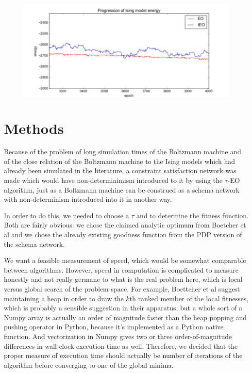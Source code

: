 \documentclass[12pt]{article}
\begin{document}
  \begin{figure}
    \includegraphics{ising_energy_zoomed}
  \end{figure}
  
  \section{Methods}


Because of the problem of long simulation times of the Boltzmann machine and of the close relation of the Boltzmann machine to the Ising models which had already been simulated in the literature, a constraint satisfaction network was made which would have non-determinimism introduced to it by using the $\tau$-EO algorithm, just as a Boltzmann machine can be construed as a schema network with non-determinism introduced into it in another way.

In order to do this, we needed to choose a $\tau$ and to determine the fitness function. Both are fairly obvious: we chose the claimed analytic optimum from Boetcher et al and we chose the already existing goodness function from the PDP version of the schema network.


We want a feasible measurement of speed, which would be somewhat comparable between algorithms. However, speed in computation is complicated to measure honestly and not really germane to what is the real problem here, which is local versus global search of the problem space. For example, Boettcher et al suggest maintaining a heap in order to draw the $k$th ranked member of the local fitnesses, which is probably a sensible suggestion in their apparatus, but a whole sort of a Numpy array is actually an order of magnitude faster than the heap popping and pushing operator in Python, because it's implemented as a Python native function. And vectorization in Numpy gives two or three order-of-magnitude differences in wall-clock execution time as well. Therefore, we decided that the proper measure of execution time should actually be number of iterations of the algorithm before converging to one of the global minima. %
\end{document}
